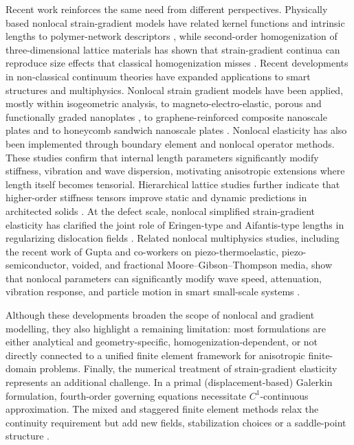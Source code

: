 \documentclass[final,3p,times,fleqn]{elsarticle}
\begin{document}
Recent work reinforces the same need from different perspectives. Physically based nonlocal strain-gradient models have related kernel functions and intrinsic lengths to polymer-network descriptors \cite{Jiang2023}, while second-order homogenization of three-dimensional lattice materials has shown that strain-gradient continua can reproduce size effects that classical homogenization misses \cite{Molavitabrizi2023}.
Recent developments in non-classical continuum theories have expanded applications to smart structures and multiphysics. Nonlocal strain gradient models have been applied, mostly within isogeometric analysis, to magneto-electro-elastic, porous and functionally graded nanoplates \cite{PhungVan2024AMM128,PhungVan2024AMM127,PhungVan2024CS335,Thai2023CS316}, to graphene-reinforced composite nanoscale plates \cite{PhungVan2023EC39} and to honeycomb sandwich nanoscale plates \cite{PhungVan2024TWS198}. Nonlocal elasticity has also been implemented through boundary element \cite{Schwartz2012EABE36} and nonlocal operator \cite{ZhangRen2023EWC39} methods. These studies confirm that internal length parameters significantly modify stiffness, vibration and wave dispersion, motivating anisotropic extensions where length itself becomes tensorial. Hierarchical lattice studies further indicate that higher-order stiffness tensors improve static and dynamic predictions in architected solids \cite{YangLiuXia2024}. At the defect scale, nonlocal simplified strain-gradient elasticity has clarified the joint role of Eringen-type and Aifantis-type lengths in regularizing dislocation fields \cite{Lazar2024}. Related nonlocal multiphysics studies, including the recent work of Gupta and co-workers on piezo-thermoelastic, piezo-semiconductor, voided, and fractional Moore--Gibson--Thompson media, show that nonlocal parameters can significantly modify wave speed, attenuation, vibration response, and particle motion in smart small-scale systems \cite{Gupta2024Impact,Gupta2024Vibrational,Gupta2024Rayleigh,Gupta2025Piezo}.


Although these developments broaden the scope of nonlocal and gradient modelling, they also highlight a remaining limitation: most formulations are either analytical and geometry-specific, homogenization-dependent, or not directly connected to a unified finite element framework for anisotropic finite-domain problems. Finally, the numerical treatment of strain-gradient elasticity represents an additional challenge. In a primal (displacement-based) Galerkin formulation, fourth-order governing equations necessitate $C^{1}$-continuous approximation. The mixed and staggered finite element methods relax the continuity requirement but add new fields, stabilization choices or a saddle-point structure \cite{AmanatidouAravas2002,AskesMorataAifantis2008,PhunpengBaiz2015}.
\end{document}
